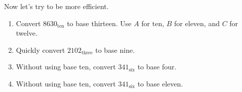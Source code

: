 \documentclass{ximera}
\begin{document}
\begin{problem}
Now let's try to be more efficient.  
\begin{enumerate}
\item Convert $8630_\textrm{ten}$ to base thirteen.  Use $A$ for ten, $B$ for eleven, and $C$ for twelve.  
\item Quickly convert $2102_\textrm{three}$ to base nine.
\item Without using base ten, convert $341_\textrm{six}$ to base four.  
\item Without using base ten, convert $341_\textrm{six}$ to base eleven.
\end{enumerate}
\end{problem}
\end{document}
